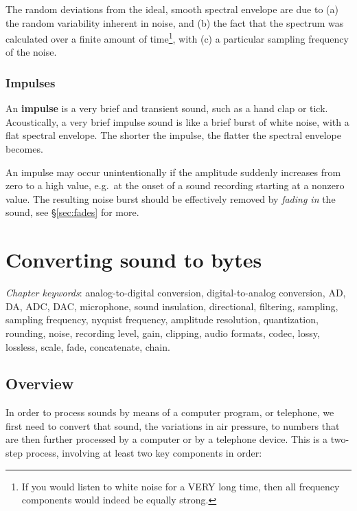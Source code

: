 \documentclass[
]{book}
\begin{document}
The random deviations from the ideal, smooth spectral envelope are due to (a) the random variability inherent in noise, and (b) the fact that the spectrum was calculated over a finite amount of time\footnote{If you would listen to white noise for a VERY long time, then all frequency components would indeed be equally strong.}, with (c) a particular sampling frequency of the noise.

\subsection{Impulses}\label{sec:impulses}

An \textbf{impulse} is a very brief and transient sound, such as a hand clap or tick. Acoustically, a very brief impulse sound is like a brief burst of white noise, with a flat spectral envelope. The shorter the impulse, the flatter the spectral envelope becomes.

An impulse may occur unintentionally if the amplitude suddenly increases from zero to a high value, e.g.~at the onset of a sound recording starting at a nonzero value. The resulting noise burst should be effectively removed by \emph{fading in} the sound, see §\ref{sec:fades} for more.

\chapter{Converting sound to bytes}\label{ch-soundtobytes}

\emph{Chapter keywords}: analog-to-digital conversion, digital-to-analog conversion, AD, DA, ADC, DAC, microphone, sound insulation, directional, filtering, sampling, sampling frequency, nyquist frequency, amplitude resolution, quantization, rounding, noise, recording level, gain, clipping, audio formats, codec, lossy, lossless, scale, fade, concatenate, chain.

\section{Overview}\label{sec:ADCoverview}

In order to process sounds by means of a computer program, or telephone, we first need to convert that sound, the variations in air pressure, to numbers that are then further processed by a computer or by a telephone device. This is a two-step process, involving at least two key components in order:
\end{document}
